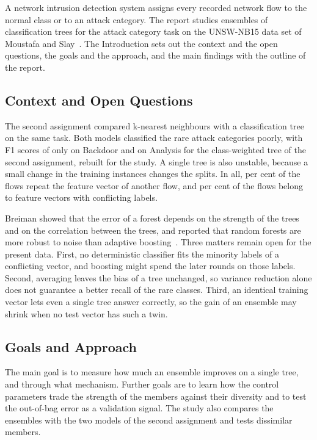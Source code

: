 \documentclass[10pt,conference]{IEEEtran}
\begin{document}
A network intrusion detection system assigns every recorded network flow to the normal class or to an attack category. The report studies ensembles of classification trees for the attack category task on the UNSW-NB15 data set of Moustafa and Slay~\cite{moustafa2015a}. The Introduction sets out the context and the open questions, the goals and the approach, and the main findings with the outline of the report.

\subsection{Context and Open Questions}
\label{sec:intro-context}

The second assignment compared k-nearest neighbours with a classification tree on the same task. Both models classified the rare attack categories poorly, with F1 scores of only \BlTreeBalancedFBackdoor{} on Backdoor and \BlTreeBalancedFAnalysis{} on Analysis for the class-weighted tree of the second assignment, rebuilt for the study. A single tree is also unstable, because a small change in the training instances changes the splits. In all, \pDup{} per cent of the flows repeat the feature vector of another flow, and \pConflictRows{} per cent of the flows belong to feature vectors with conflicting labels.

Breiman showed that the error of a forest depends on the strength of the trees and on the correlation between the trees, and reported that random forests are more robust to noise than adaptive boosting~\cite{breiman2001}. Three matters remain open for the present data. First, no deterministic classifier fits the minority labels of a conflicting vector, and boosting might spend the later rounds on those labels. Second, averaging leaves the bias of a tree unchanged, so variance reduction alone does not guarantee a better recall of the rare classes. Third, an identical training vector lets even a single tree answer correctly, so the gain of an ensemble may shrink when no test vector has such a twin.

\subsection{Goals and Approach}
\label{sec:intro-goals}

The main goal is to measure how much an ensemble improves on a single tree, and through what mechanism. Further goals are to learn how the control parameters trade the strength of the members against their diversity and to test the out-of-bag error as a validation signal. The study also compares the ensembles with the two models of the second assignment and tests dissimilar members.
\end{document}
